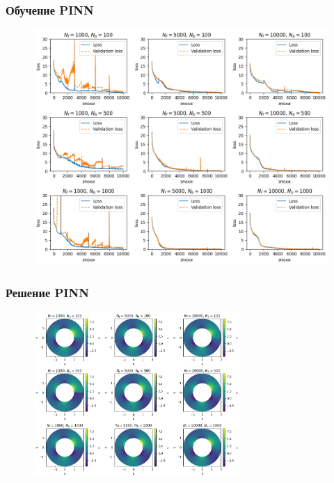 \documentclass[t]{beamer}
\begin{document}
    \begin{frame}
        \frametitle{Обучение PINN}
        \begin{figure}[htb!]
            \includegraphics[height=0.7\textwidth]{../plots/termal/loss alt l = (20x4) Nf=[1000, 5000, 10000] Nu=[100, 500, 1000].png}
        \end{figure}
    \end{frame}
    \begin{frame}
        \frametitle{Решение PINN}
        \begin{figure}[ht]
            \center
            \includegraphics[width=0.7\textwidth]{../plots/termal/solut l = (20x4) Nf=[1000, 5000, 10000] Nu=[100, 500, 1000].png}
        \end{figure}    
    \end{frame}
\end{document}
